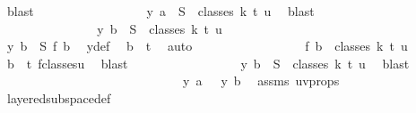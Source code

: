 \begin{isabellebody}
\ blast\isanewline
\ \ \ \ \ \ \ \ \ \ \ \ \ \ \isamarkupfalse%
\ \isamarkupfalse%
\ {\isachardoublequoteopen}y\ a\ {\isasymin}\ S\ {\isacharbackquote}{\kern0pt}\ classes\ k\ t\ u{\isachardoublequoteclose}\ \isamarkupfalse%
\ blast\isanewline
\ \ \ \ \ \ \ \ \ \ \ \ \isamarkupfalse%
\isanewline
\ \ \ \ \ \ \ \ \ \ \ \ \isamarkupfalse%
\ \isamarkupfalse%
\ {\isachardoublequoteopen}y\ b\ {\isasymin}\ S\ {\isacharbackquote}{\kern0pt}\ classes\ k\ t\ u{\isachardoublequoteclose}\isanewline
\ \ \ \ \ \ \ \ \ \ \ \ \isamarkupfalse%
\ {\isacharminus}{\kern0pt}\isanewline
\ \ \ \ \ \ \ \ \ \ \ \ \ \ \isamarkupfalse%
\ {\isachardoublequoteopen}y\ b\ {\isacharequal}{\kern0pt}\ S\ {\isacharparenleft}{\kern0pt}{\isacharquery}{\kern0pt}f\ b{\isacharparenright}{\kern0pt}{\isachardoublequoteclose}\ \isamarkupfalse%
\ y{\isacharunderscore}{\kern0pt}def\ \isamarkupfalse%
\ {\isacartoucheopen}b\ {\isacharless}{\kern0pt}\ t{\isacartoucheclose}\ \isamarkupfalse%
\ auto\isanewline
\ \ \ \ \ \ \ \ \ \ \ \ \ \ \isamarkupfalse%
\ \isamarkupfalse%
\ {\isachardoublequoteopen}{\isacharquery}{\kern0pt}f\ b\ {\isasymin}\ classes\ k\ t\ u{\isachardoublequoteclose}\ \isamarkupfalse%
\ {\isacartoucheopen}b\ {\isacharless}{\kern0pt}\ t{\isacartoucheclose}\ f{\isacharunderscore}{\kern0pt}classes{\isacharunderscore}{\kern0pt}u\ \isamarkupfalse%
\ blast\isanewline
\ \ \ \ \ \ \ \ \ \ \ \ \ \ \isamarkupfalse%
\ \isamarkupfalse%
\ {\isachardoublequoteopen}y\ b\ {\isasymin}\ S\ {\isacharbackquote}{\kern0pt}\ classes\ k\ t\ u{\isachardoublequoteclose}\ \isamarkupfalse%
\ blast\isanewline
\ \ \ \ \ \ \ \ \ \ \ \ \isamarkupfalse%
\isanewline
\ \ \ \ \ \ \ \ \ \ \ \ \isamarkupfalse%
\ \isamarkupfalse%
\ {\isachardoublequoteopen}{\isasymchi}\ {\isacharparenleft}{\kern0pt}y\ a{\isacharparenright}{\kern0pt}\ {\isacharequal}{\kern0pt}\ {\isasymchi}\ {\isacharparenleft}{\kern0pt}y\ b{\isacharparenright}{\kern0pt}{\isachardoublequoteclose}\ \isamarkupfalse%
\ assms{\isacharparenleft}{\kern0pt}{}{\isacharparenright}{\kern0pt}\ uv{\isacharunderscore}{\kern0pt}props\ \isamarkupfalse%
\ layered{\isacharunderscore}{\kern0pt}subspace{\isacharunderscore}{\kern0pt}def\ \isamarkupfalse%

\end{isabellebody}
